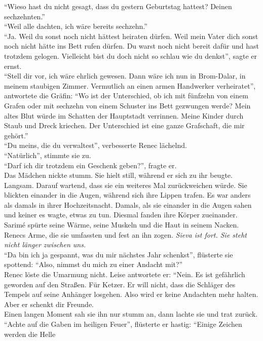 ``Wieso hast du nicht gesagt, dass du gestern Geburtstag hattest? Deinen sechzehnten.''\\
``Weil alle dachten, ich wäre bereits sechzehn.''\\
``Ja. Weil du sonst noch nicht hättest heiraten dürfen. Weil mein Vater dich sonst noch nicht hätte 
ins Bett rufen dürfen. Du warst noch nicht bereit dafür und hast trotzdem gelogen. Vielleicht bist 
du doch nicht so schlau wie du denkst'', sagte er ernst.\\
``Stell dir vor, ich wäre ehrlich gewesen. Dann wäre ich nun in Brom-Dalar, in meinem staubigen 
Zimmer. Vermutlich an einen armen Handwerker verheiratet'', antwortete die Gräfin: ``Wo ist der 
Unterschied, ob ich mit fünfzehn von einem Grafen oder mit sechzehn von einem Schuster ins Bett 
gezwungen werde? Mein altes Blut würde im Schatten der Hauptstadt verrinnen. Meine Kinder durch 
Staub und Dreck kriechen. Der Unterschied ist eine ganze Grafschaft, die mir gehört.''\\
``Du meins, die du verwaltest'', verbesserte Renec lächelnd.\\
``Natürlich'', stimmte sie zu.\\
``Darf ich dir trotzdem ein Geschenk geben?'', fragte er.\\
Das Mädchen nickte stumm. Sie hielt still, während er sich zu ihr beugte. Langsam. Darauf 
wartend, dass sie ein weiteres Mal zurückweichen würde. Sie blickten einander in die Augen, während 
sich ihre Lippen trafen. Es war anders als damals in ihrer Hochzeitsnacht. Damals, als sie 
einander in die Augen sahen und keiner es wagte, etwas zu tun. Diesmal fanden ihre Körper 
zueinander. Sarimé spürte seine Wärme, seine Muskeln und die Haut in seinem Nacken. Renecs Arme, 
die sie umfassten und fest an ihn zogen. \textit{Sieva ist fort. Sie steht nicht länger zwischen 
uns.}\\
``Da bin ich ja gespannt, was du mir nächstes Jahr schenkst'', flüsterte sie spottend: 
``Also, nimmst du mich zu einer Andacht mit?''\\
Renec löste die Umarmung nicht. Leise antwortete er: ``Nein. Es ist gefährlich geworden auf den 
Straßen. Für Ketzer. Er will nicht, dass die Schläger des Tempels auf seine Anhänger losgehen. Also 
wird er keine Andachten mehr halten. Aber er schenkt dir Freunde.\\
Einen langen Moment sah sie ihn nur stumm an, dann lachte sie und trat zurück.\\
``Achte auf die Gaben im heiligen Feuer'', flüsterte er hastig: ``Einige Zeichen werden die Helle 
